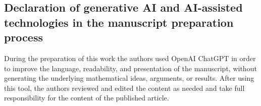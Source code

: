 \documentclass[11pt,letterpaper]{article}
\theoremstyle{plain}
\theoremstyle{remark}
\begin{document}
\subsection*{Declaration of generative AI and AI-assisted technologies in the manuscript preparation process}
During the preparation of this work the authors used OpenAI ChatGPT in order to improve the language, readability, and presentation of the manuscript, without generating the underlying mathematical ideas, arguments, or results. After using this tool, the authors reviewed and edited the content as needed and take full responsibility for the content of the published article.



\end{document}
